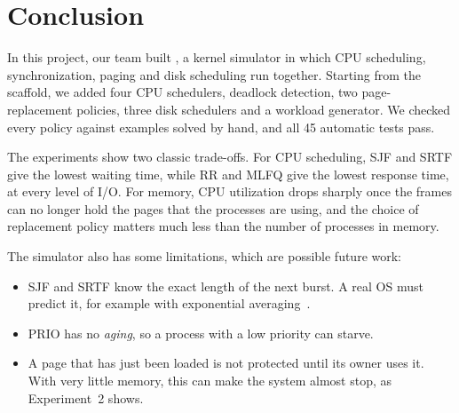 \section{Conclusion}
\label{sec:conclusion}
In this project, our team built \ossim, a kernel simulator in which CPU scheduling, synchronization, paging and disk scheduling run together. Starting from the scaffold, we added four CPU schedulers, deadlock detection, two page-replacement policies, three disk schedulers and a workload generator. We checked every policy against examples solved by hand, and all 45 automatic tests pass.

The experiments show two classic trade-offs. For CPU scheduling, SJF and SRTF give the lowest waiting time, while RR and MLFQ give the lowest response time, at every level of I/O. For memory, CPU utilization drops sharply once the frames can no longer hold the pages that the processes are using, and the choice of replacement policy matters much less than the number of processes in memory. 

The simulator also has some limitations, which are possible future work:
\begin{itemize}
    \item SJF and SRTF know the exact length of the next burst. A real OS must predict it, for example with exponential averaging~\cite[Sec.~5.3.2]{silberschatz}.
    \item PRIO has no \emph{aging}, so a process with a low priority can starve.
    \item A page that has just been loaded is not protected until its owner uses it. With very little memory, this can make the system almost stop, as Experiment~2 shows.
\end{itemize}

